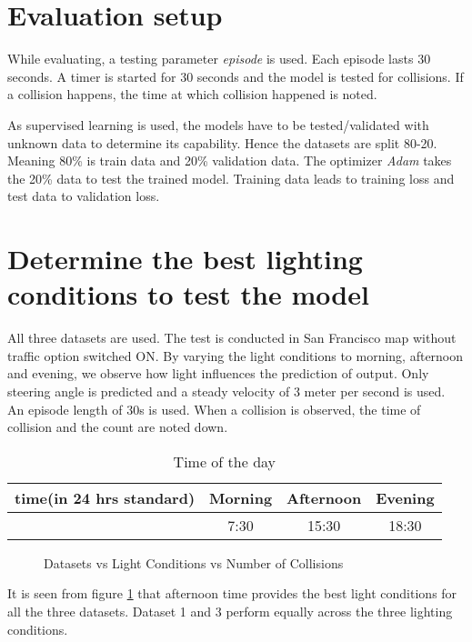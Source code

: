 \section*{Evaluation setup}
While evaluating, a testing parameter \textit{episode} is used. Each episode lasts 30 seconds. A timer is started for 30 seconds and
the  model is tested for collisions. If a collision happens, the time at which collision
happened is noted.

As supervised learning is used, the models have to be tested/validated with unknown data
to determine its capability. Hence the datasets are split 80-20. Meaning 80\% is train
data and 20\% validation data. The optimizer \textit{Adam} takes the 20\% data to test the
trained model. Training data leads to training loss and test data to validation loss.

\section{Determine the best lighting conditions to test the model}
\label{chapter05subsec:setup1}
All three datasets are used. The test is conducted in San Francisco map without traffic
option switched ON. By varying the light conditions to morning, afternoon and evening, we
observe how light influences the prediction of output. Only steering angle is predicted
and a steady velocity of 3 meter per second is used. An episode length of 30s is used.
When a collision is observed, the time of collision and the count are noted down.
\begin{table}[t]
    \centering
\begin{tabular}{|c c c c|}
    \hline
    time(in 24 hrs standard) & Morning & Afternoon & Evening \\\hline
      & 7:30 & 15:30 & 18:30 \\\hline
\end{tabular}
\caption{Time of the day}
\label{table:timeoftheday}
\end{table}

\begin{figure}
	\centering
    \def\svgwidth{0.6\textwidth}
    \caption{Datasets vs Light Conditions vs Number of Collisions}
    \label{fig:dsvslcvsncolsetup1}
\end{figure}

It is seen from figure \ref{fig:dsvslcvsncolsetup1} that afternoon time provides the best light conditions for all the three
datasets. Dataset 1 and 3 perform equally across the three lighting conditions.

